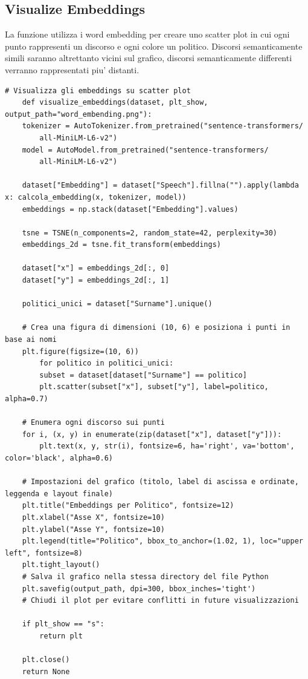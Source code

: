 \documentclass{article}
\begin{document}
		\subsection{Visualize Embeddings}
La funzione utilizza i word embedding per creare uno scatter plot in cui ogni punto rappresenti un discorso e ogni colore un politico. Discorsi semanticamente simili saranno altrettanto vicini sul grafico, discorsi semanticamente differenti verranno rappresentati piu' distanti.
	\begin{lstlisting}
# Visualizza gli embeddings su scatter plot
	def visualize_embeddings(dataset, plt_show, output_path="word_embending.png"):
	tokenizer = AutoTokenizer.from_pretrained("sentence-transformers/
		all-MiniLM-L6-v2")
	model = AutoModel.from_pretrained("sentence-transformers/
		all-MiniLM-L6-v2")
	
	dataset["Embedding"] = dataset["Speech"].fillna("").apply(lambda x: calcola_embedding(x, tokenizer, model))
	embeddings = np.stack(dataset["Embedding"].values)
	
	tsne = TSNE(n_components=2, random_state=42, perplexity=30)
	embeddings_2d = tsne.fit_transform(embeddings)
	
	dataset["x"] = embeddings_2d[:, 0]
	dataset["y"] = embeddings_2d[:, 1]
	
	politici_unici = dataset["Surname"].unique()
	
	# Crea una figura di dimensioni (10, 6) e posiziona i punti in base ai nomi
	plt.figure(figsize=(10, 6))
		for politico in politici_unici:
		subset = dataset[dataset["Surname"] == politico]
		plt.scatter(subset["x"], subset["y"], label=politico, alpha=0.7)

	# Enumera ogni discorso sui punti 
	for i, (x, y) in enumerate(zip(dataset["x"], dataset["y"])):
		plt.text(x, y, str(i), fontsize=6, ha='right', va='bottom', color='black', alpha=0.6)

	# Impostazioni del grafico (titolo, label di ascissa e ordinate, leggenda e layout finale)
	plt.title("Embeddings per Politico", fontsize=12)
	plt.xlabel("Asse X", fontsize=10)
	plt.ylabel("Asse Y", fontsize=10)
	plt.legend(title="Politico", bbox_to_anchor=(1.02, 1), loc="upper left", fontsize=8)
	plt.tight_layout()
	# Salva il grafico nella stessa directory del file Python
	plt.savefig(output_path, dpi=300, bbox_inches='tight')
	# Chiudi il plot per evitare conflitti in future visualizzazioni
	
	if plt_show == "s":
		return plt
	
	plt.close()
	return None
	\end{lstlisting}
\end{document}

